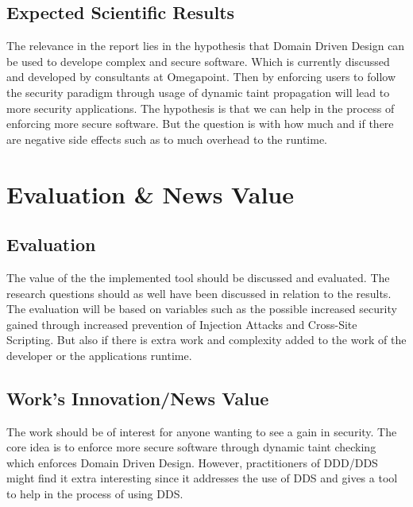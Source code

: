\documentclass{../kththesis}
\begin{document}
\section{Expected Scientific Results}
The relevance in the report lies in the hypothesis that Domain Driven Design can be used to develope complex and secure software. Which is currently discussed and developed by consultants at Omegapoint. Then by enforcing users to follow the security paradigm through usage of dynamic taint propagation will lead to more security applications. The hypothesis is that we can help in the process of enforcing more secure software. But the question is with how much and if there are negative side effects such as to much overhead to the runtime.



\chapter{Evaluation \& News Value}
\section{Evaluation}
The value of the the implemented tool should be discussed and evaluated. The research questions should as well have been discussed in relation to the results. The evaluation will be based on variables such as the possible increased security gained through increased prevention of Injection Attacks and Cross-Site Scripting. But also if there is extra work and complexity added to the work of the developer or the applications runtime.


\section{Work's Innovation/News Value}
The work should be of interest for anyone wanting to see a gain in security. The core idea is to enforce more secure software through dynamic taint checking which enforces Domain Driven Design. However, practitioners of DDD/DDS might find it extra interesting since it addresses the use of DDS and gives a tool to help in the process of using DDS.
\end{document}
